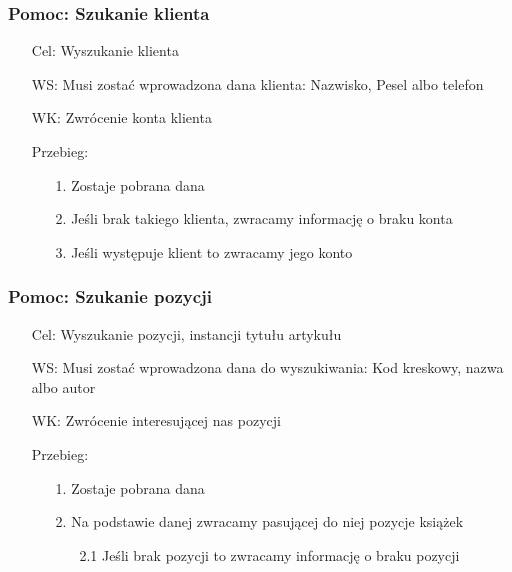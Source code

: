 \documentclass{article}
\begin{document}
	\subsubsection{Pomoc: Szukanie klienta}
	\begin{enumerate}
		\item[Cel:] Wyszukanie klienta
		\item[WS:] Musi zostać wprowadzona dana klienta: Nazwisko, Pesel albo telefon
		\item[WK:] Zwrócenie konta klienta
		\item[Przebieg:]
	\begin{enumerate}
		\item [1.]Zostaje pobrana dana
		\item [2.]Jeśli brak takiego klienta, zwracamy informację o braku konta
		\item [3.]Jeśli występuje klient to zwracamy jego konto
	\end{enumerate}
	\end{enumerate}
	
	\subsubsection{Pomoc: Szukanie pozycji}
	\begin{enumerate}
		\item[Cel:] Wyszukanie pozycji, instancji tytułu artykułu
		\item[WS:] Musi zostać wprowadzona dana do wyszukiwania: Kod kreskowy, nazwa albo autor
		\item[WK:] Zwrócenie interesującej nas pozycji
		\item[Przebieg:]
	\begin{enumerate}
		\item [1.]Zostaje pobrana dana
		\item [2.]Na podstawie danej zwracamy pasującej do niej pozycje książek
		\begin{enumerate}
		\item [2.1] Jeśli brak pozycji to zwracamy informację o braku pozycji
		\end{enumerate}
	\end{enumerate}
	\end{enumerate}
\end{document}
